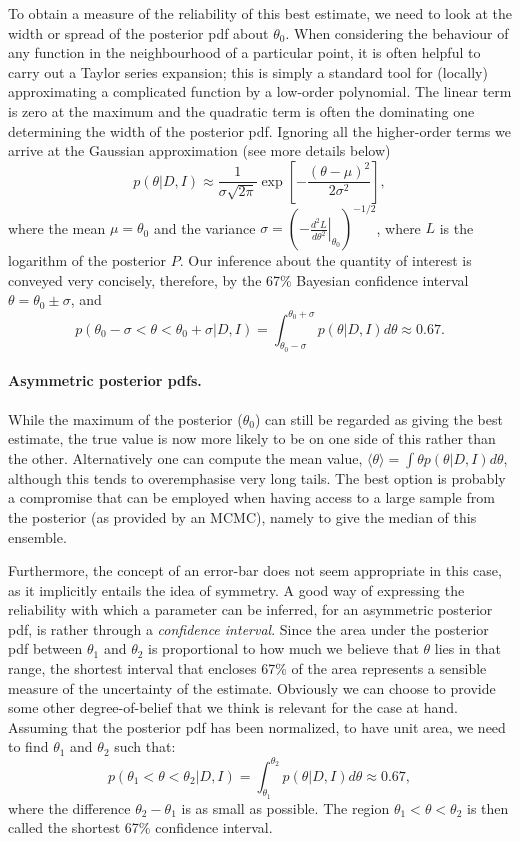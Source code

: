 \documentclass[%
oneside,                 %
final,                   %
10pt]{article}
\begin{document}
To obtain a measure of the reliability of this best estimate, we need to look at the width or spread of the posterior pdf about $\theta_0$. When considering the behaviour of any function in the neighbourhood of a particular point, it is often helpful to carry out a Taylor series expansion; this is simply a standard tool for (locally) approximating a complicated function by a low-order polynomial. The linear term is zero at the maximum and the quadratic term is often the dominating one determining the width of the posterior pdf. Ignoring all the higher-order terms we arrive at the Gaussian approximation (see more details below)
\begin{equation}
p(\theta|D,I) \approx \frac{1}{\sigma\sqrt{2\pi}} \exp \left[ -\frac{(\theta-\mu)^2}{2\sigma^2} \right],
\end{equation}
where the mean $\mu = \theta_0$ and the variance $\sigma = \left( - \left. \frac{d^2L}{d\theta^2} \right|_{\theta_0} \right)^{-1/2}$, where $L$ is the logarithm of the posterior $P$. Our inference about the quantity of interest is conveyed very concisely, therefore, by the 67\% Bayesian confidence interval $\theta = \theta_0 \pm \sigma$, and 
\[
p(\theta_0-\sigma < \theta < \theta_0+\sigma | D,I) = \int_{\theta_0-\sigma}^{\theta_0+\sigma} p(\theta|D,I) d\theta \approx 0.67.
\]

\paragraph{Asymmetric posterior pdfs.}
While the maximum of the posterior ($\theta_0$) can still be regarded as giving the best estimate, the true value is now more likely to be on one side of this rather than the other. Alternatively one can compute the mean value, $\langle \theta \rangle = \int \theta p(\theta|D,I) d\theta$, although this tends to overemphasise very long tails. The best option is probably a compromise that can be employed when having access to a large sample from the posterior (as provided by an MCMC), namely to give the median of this ensemble.

Furthermore, the concept of an error-bar does not seem appropriate in this case, as it implicitly entails the idea of symmetry. A good way of expressing the reliability with which a parameter can be inferred, for an asymmetric posterior pdf, is rather through a \emph{confidence interval}. Since the area under the posterior pdf between $\theta_1$ and $\theta_2$ is proportional to how much we believe that $\theta$ lies in that range, the shortest interval that encloses 67\% of the area represents a sensible measure of the uncertainty of the estimate. Obviously we can choose to provide some other degree-of-belief that we think is relevant for the case at hand. Assuming that the posterior pdf has been normalized, to have unit area, we need to find $\theta_1$ and $\theta_2$ such that: 
\[
p(\theta_1 < \theta < \theta_2 | D,I) = \int_{\theta_1}^{\theta_2} p(\theta|D,I) d\theta \approx 0.67, 
\]
where the difference $\theta_2 - \theta_1$ is as small as possible. The region $\theta_1 < \theta < \theta_2$ is then called the shortest 67\% confidence interval. 
\end{document}

